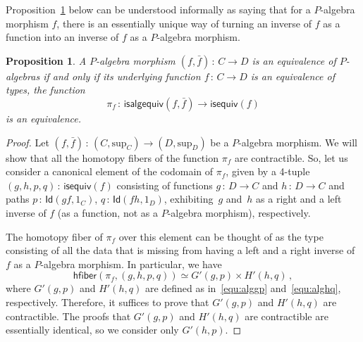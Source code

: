 \documentclass[10pt,a4paper,oneside,reqno]{amsart}
\numberwithin{equation}{section}
\theoremstyle{mythm}
\newtheorem{proposition}[theorem]{Proposition}
\theoremstyle{mydef}
\theoremstyle{myrmk}
\newcommand{\ie}{\text{i.e.\ }}
\newcommand{\co}{\,{:}\,}
\newcommand{\hfiber}{\mathsf{hfiber}}
\newcommand{\Id}{\mathsf{Id}}
\renewcommand{\sup}{\mathrm{sup}}
\newcommand{\isalgequiv}{\mathsf{isalgequiv}}
\begin{document}
Proposition~\ref{WAlgSpace} below can be understood informally as saying that for a $P$-algebra morphism $f$, there is an essentially unique way of turning an inverse of $f$ as a function into an inverse of $f$ as a $P$-algebra morphism.

\begin{proposition}\label{WAlgSpace} A $P$-algebra morphism $(f, \bar{f}) \co C \to D$ is an equivalence of
$P$-algebras if and only
if its underlying function $f \co C \to D$ is an equivalence of types, \ie the function 
\[
\pi_f \co \isalgequiv(f, \bar{f})  \to \mathsf{isequiv}(f)  
\]
is an equivalence. 
\end{proposition}  




\begin{proof} Let $(f, \bar{f}) \co (C, \sup_C) \to (D, \sup_D)$ be a  $P$-algebra morphism. We will 
show that all the homotopy fibers of the function $\pi_f$ are contractible.
So, let us consider a canonical element of the codomain of $\pi_f$,  given by a 4-tuple $( g, h, p, q) \co \mathsf{isequiv}(f)$ consisting of functions $g \co D \to C$ and $h \co D \to C$ and paths $p \co \Id(gf, 1_C)$, $q \co \Id(fh, 1_D)$,
exhibiting~$g$ and~$h$ as a right and a left inverse of $f$ (as a function, not as a $P$-algebra morphism), respectively. 

The homotopy fiber of $\pi_f$ over this element can be thought of as the type consisting of all
the data that is missing from having a left and a right inverse of $f$ as a $P$-algebra morphism. 
In particular, we have
\begin{equation*}
\hfiber(\pi_f, (g, h, p, q ) ) \simeq G'(g,p) \times H'(h,q) \, ,
\end{equation*}
where $G'(g,p)$ and $H'(h,q)$ are defined as in~\eqref{equ:alggp} and~\eqref{equ:alghq}, respectively.
Therefore, it suffices to prove that $G'(g,p)$ and $H'(h,q)$ are  contractible.  The proofs that $G'(g,p)$ and $H'(h,q)$ are contractible are essentially identical, so we consider only $G'(h,p)$.


\end{proof}
\end{document}
